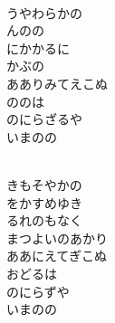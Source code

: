 \documentclass[10pt,b5j]{tarticle} %
\begin{document}
\vspace{1.5em} %
\newcommand{\linespace}{0.5em} %
\newcommand{\blocksize}{0.5\hsize} %
\newcommand{\itemmargin}{3em} %
\begin{enumerate} %
    \setlength{\itemindent}{\itemmargin} %
    \begin{minipage}[c]{\blocksize}
    
        \vspace{\linespace}
        \item~\\
        うやわらかの\\
        んのの\\
        にかかるに\\
        かぶの\\
        あありみてえこぬ\\
        ののは\\
        のにらざるや\\
        いまのの
        
    \end{minipage}
    \begin{minipage}[c]{\blocksize}
        
        \vspace{\linespace}
        \item~\\
        きもそやかの\\
        をかすめゆき\\
        るれのもなく\\
        まつよいのあかり\\
        ああにえてぎこぬ\\
        おどるは\\
        のにらずや\\
        いまのの
        

\end{minipage}
\end{enumerate}
\end{document}
